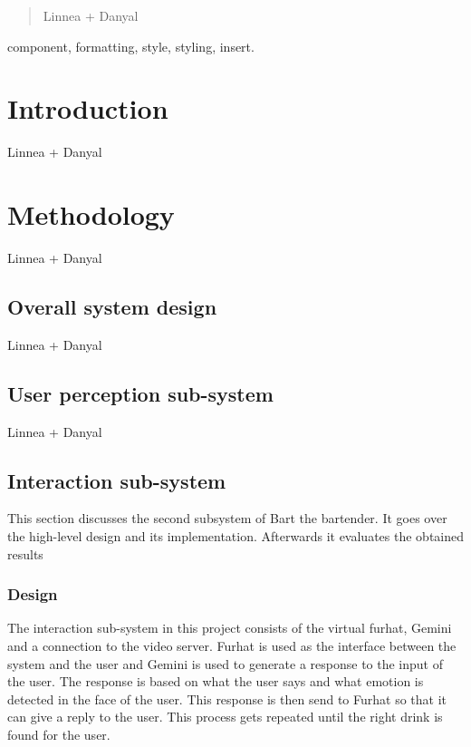 \documentclass[conference]{IEEEtran}
\begin{document}
\begin{abstract}
Linnea + Danyal
\end{abstract}

\begin{IEEEkeywords}
component, formatting, style, styling, insert.
\end{IEEEkeywords}

\section{Introduction}
Linnea + Danyal

\section{Methodology}
Linnea + Danyal

\subsection{Overall system design}
Linnea + Danyal

\subsection{User perception sub-system}
Linnea + Danyal

\subsection{Interaction sub-system} %
This section discusses the second subsystem of Bart the bartender. 
It goes over the high-level design and its implementation. 
Afterwards it evaluates the obtained results

\subsubsection{Design}
The interaction sub-system in this project consists of the virtual furhat, Gemini and a connection to the video server.
Furhat is used as the interface between the system and the user and Gemini is used to generate a response to the input of the user.
The response is based on what the user says and what emotion is detected in the face of the user.
This response is then send to Furhat so that it can give a reply to the user.
This process gets repeated until the right drink is found for the user.
\end{document}
